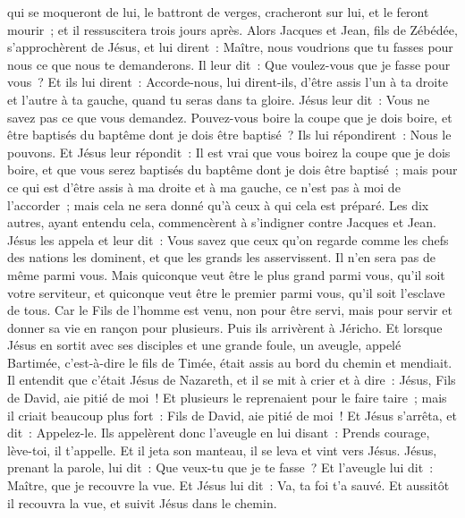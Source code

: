 \begin{multicols}{2}
qui se moqueront de lui, le battront de verges, cracheront sur lui, et le feront mourir~; et il ressuscitera trois jours après.
Alors Jacques et Jean, fils de Zébédée, s'approchèrent de Jésus, et lui dirent~: Maître, nous voudrions que tu fasses pour nous ce que nous te demanderons.
Il leur dit~: Que voulez-vous que je fasse pour vous~?
Et ils lui dirent~: Accorde-nous, lui dirent-ils, d'être assis l'un à ta droite et l'autre à ta gauche, quand tu seras dans ta gloire.
Jésus leur dit~: Vous ne savez pas ce que vous demandez. Pouvez-vous boire la coupe que je dois boire, et être baptisés du baptême dont je dois être baptisé~?
Ils lui répondirent~: Nous le pouvons. Et Jésus leur répondit~: Il est vrai que vous boirez la coupe que je dois boire, et que vous serez baptisés du baptême dont je dois être baptisé~;
mais pour ce qui est d'être assis à ma droite et à ma gauche, ce n'est pas à moi de l'accorder~; mais cela ne sera donné qu'à ceux à qui cela est préparé.
Les dix autres, ayant entendu cela, commencèrent à s'indigner contre Jacques et Jean.
Jésus les appela et leur dit~: Vous savez que ceux qu'on regarde comme les chefs des nations les dominent, et que les grands les asservissent.
Il n'en sera pas de même parmi vous. Mais quiconque veut être le plus grand parmi vous, qu'il soit votre serviteur,
et quiconque veut être le premier parmi vous, qu'il soit l'esclave de tous.
Car le Fils de l'homme est venu, non pour être servi, mais pour servir et donner sa vie en rançon pour plusieurs.
Puis ils arrivèrent à Jéricho. Et lorsque Jésus en sortit avec ses disciples et une grande foule, un aveugle, appelé Bartimée, c'est-à-dire le fils de Timée, était assis au bord du chemin et mendiait.
Il entendit que c'était Jésus de Nazareth, et il se mit à crier et à dire~: Jésus, Fils de David, aie pitié de moi~!
Et plusieurs le reprenaient pour le faire taire~; mais il criait beaucoup plus fort~: Fils de David, aie pitié de moi~!
Et Jésus s'arrêta, et dit~: Appelez-le. Ils appelèrent donc l'aveugle en lui disant~: Prends courage, lève-toi, il t'appelle.
Et il jeta son manteau, il se leva et vint vers Jésus.
Jésus, prenant la parole, lui dit~: Que veux-tu que je te fasse~? Et l'aveugle lui dit~: Maître, que je recouvre la vue.
Et Jésus lui dit~: Va, ta foi t'a sauvé.
Et aussitôt il recouvra la vue, et suivit Jésus dans le chemin.

\end{multicols}
